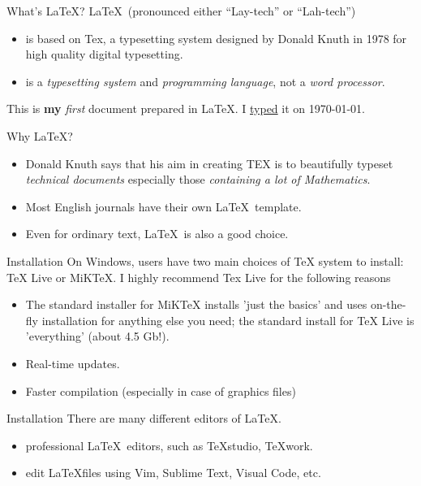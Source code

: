 \documentclass[11pt]{beamer}
\begin{document}
\begin{CJK*}{UTF8}{gkai}
\begin{frame}[fragile]{What's \LaTeX?}
\LaTeX\ (pronounced either “Lay-tech” or “Lah-tech”) 
	\begin{itemize}
		\item is based on Tex, a typesetting system designed by Donald Knuth in 1978 for high quality digital typesetting.
		\item is a \textit{typesetting system} and \textit{programming language}, not a \textit{word processor}.
	\end{itemize}

\vskip 0.25cm
\begin{LTXexample}[caption={the typesetting nature of \LaTeX}]
This is \textbf{my} \emph{first} document prepared in \LaTeX. I \underline{typed} it on \today.
\end{LTXexample} 
\end{frame}

\begin{frame}{Why \LaTeX?}
\begin{itemize}
	\item Donald Knuth says that his aim in creating TEX is to beautifully
	typeset \textit{technical documents} especially those \textit{containing a lot of Mathematics}.
	\item Most English journals have their own \LaTeX\ template.
	\item Even for ordinary text, \LaTeX\ is also a good choice.
\end{itemize}
\end{frame}

\begin{frame}{Installation}
	On Windows, users have two main choices of TeX system to install: \alert{TeX Live} or \alert{MiKTeX}. I highly recommend Tex Live for the following reasons
	\begin{itemize}
		\item The standard installer for MiKTeX installs 'just the basics' and uses on-the-fly installation for anything else you need; the standard install for TeX Live is 'everything' (about 4.5 Gb!).
		\item Real-time updates.
		\item Faster compilation (especially in case of graphics files)
	\end{itemize}
\end{frame}

\begin{frame}{Installation}
There are many different editors of \LaTeX.
\begin{itemize}
\item professional \LaTeX\ editors, such as TeXstudio, TeXwork.
\item edit \LaTeX files using Vim, Sublime Text, Visual Code, etc.
\end{itemize}
 \vskip 0.75cm


\end{frame}
\end{CJK*}
\end{document}
